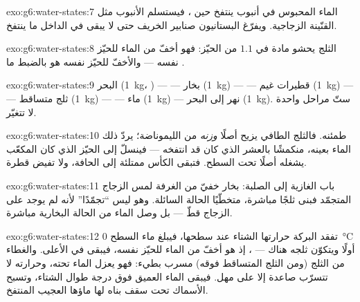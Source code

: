 \begin{solution}{exo:g6:water-states:7}
الماء المحبوس في أنبوب ينتفخ حين ، فيستسلم الأنبوب مثل
القنّينة الزجاجية. ويفرّغ البستانيون صنابير الخريف حتى لا يبقى
في الداخل ما ينتفخ.
\end{solution}

\begin{solution}{exo:g6:water-states:8}
الثلج يحشو مادة  في $1.1$  من الحيّز: فهو أخفّ من الماء
للحيّز نفسه --- والأخفّ للحيّز نفسه هو بالضبط ما .
\end{solution}

\begin{solution}{exo:g6:water-states:9}
البحر (\qty{1}{kg}، ) ---  --- بخار (\qty{1}{kg}) ---
 --- قطيرات غيم (\qty{1}{kg}) ---  --- ثلج متساقط
(\qty{1}{kg}) ---  --- ماء  (\qty{1}{kg}) --- نهر
إلى البحر (\qty{1}{kg}). ستّ مراحل  واحدة لا تتغيّر.
\end{solution}

\begin{solution}{exo:g6:water-states:10}
طمئنه. فالثلج الطافي يزيح أصلًا \emph{وزنه} من الليموناضة؛
 يردّ ذلك الماء بعينه، منكمشًا بالعشر الذي كان قد
انتفخه --- فينسلّ إلى الحيّز الذي كان المكعّب يشغله أصلًا تحت
السطح. فتبقى الكأس ممتلئة إلى الحافة، ولا تفيض قطرة.
\end{solution}

\begin{solution}{exo:g6:water-states:11}
باب الغازية إلى الصلبة: بخار خفيّ من  الغرفة لمس الزجاج
المتجمّد فبنى ثلجًا مباشرة، متخطّيًا الحالة السائلة. وهو ليس
``تجمّدًا'' لأنه لم يوجد على الزجاج  قطّ --- بل وصل الماء
من الحالة البخارية مباشرة.
\end{solution}

\begin{solution}{exo:g6:water-states:12}
تفقد البركة حرارتها  الشتاء عند سطحها، فيبلغ ماء السطح
\qty{0}{\celsius} أولًا ويتكوّن ثلجه هناك --- ، إذ هو
أخفّ من الماء للحيّز نفسه، فيبقى في الأعلى. والغطاء من الثلج
(ومن الثلج المتساقط فوقه) مسرب بطيء: فهو يعزل الماء تحته،
وحرارته لا تتسرّب صاعدة إلا على مهل. فيبقى الماء العميق فوق
درجة  طوال الشتاء، وتسبح الأسماك تحت سقف بناه لها ماؤها
العجيب المنتفخ.
\end{solution}

